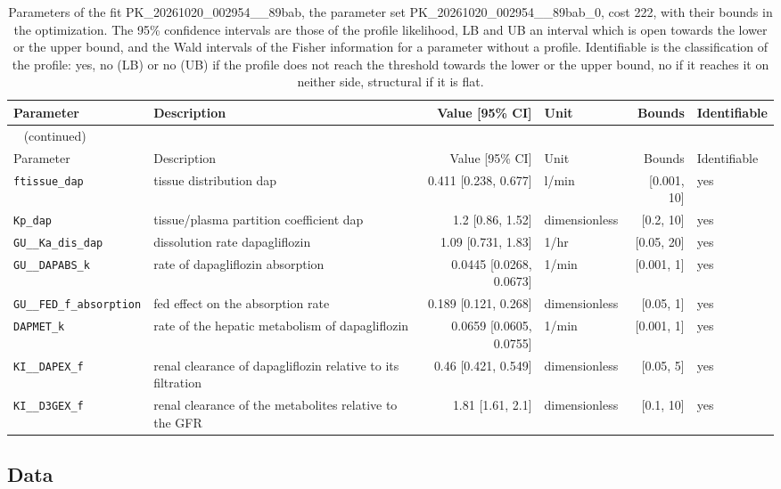\documentclass{article}
\begin{document}
\begin{longtable}{llrlrl}
\caption{Parameters of the fit PK\_20261020\_002954\_\_89bab, the parameter set PK\_20261020\_002954\_\_89bab\_0, cost 222, with their bounds in the optimization. The 95\% confidence intervals are those of the profile likelihood, LB and UB an interval which is open towards the lower or the upper bound, and the Wald intervals of the Fisher information for a parameter without a profile. Identifiable is the classification of the profile: yes, no (LB) or no (UB) if the profile does not reach the threshold towards the lower or the upper bound, no if it reaches it on neither side, structural if it is flat.}\label{tab:parameters:PK_20261020_002954__89bab} \\
\toprule
Parameter & Description & Value [95\% CI] & Unit & Bounds & Identifiable \\
\midrule
\endfirsthead
\multicolumn{6}{l}{\small\tablename~\thetable{} (continued)} \\
\toprule
Parameter & Description & Value [95\% CI] & Unit & Bounds & Identifiable \\
\midrule
\endhead
\bottomrule
\endlastfoot
\texttt{ftissue\_dap} & tissue distribution dap & 0.411 [0.238, 0.677] & l/min & [0.001, 10] & yes \\
\texttt{Kp\_dap} & tissue/plasma partition coefficient dap & 1.2 [0.86, 1.52] & dimensionless & [0.2, 10] & yes \\
\texttt{GU\_\_Ka\_dis\_dap} & dissolution rate dapagliflozin & 1.09 [0.731, 1.83] & 1/hr & [0.05, 20] & yes \\
\texttt{GU\_\_DAPABS\_k} & rate of dapagliflozin absorption & 0.0445 [0.0268, 0.0673] & 1/min & [0.001, 1] & yes \\
\texttt{GU\_\_FED\_f\_absorption} & fed effect on the absorption rate & 0.189 [0.121, 0.268] & dimensionless & [0.05, 1] & yes \\
\texttt{DAPMET\_k} & rate of the hepatic metabolism of dapagliflozin & 0.0659 [0.0605, 0.0755] & 1/min & [0.001, 1] & yes \\
\texttt{KI\_\_DAPEX\_f} & renal clearance of dapagliflozin relative to its filtration & 0.46 [0.421, 0.549] & dimensionless & [0.05, 5] & yes \\
\texttt{KI\_\_D3GEX\_f} & renal clearance of the metabolites relative to the GFR & 1.81 [1.61, 2.1] & dimensionless & [0.1, 10] & yes \\
\end{longtable}

\subsection{Data}
\end{document}

